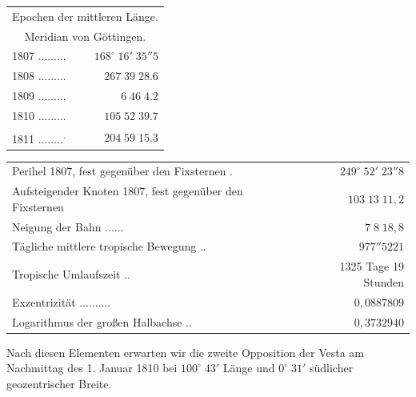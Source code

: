 \begin{center}\fontsize{10}{12}\selectfont\setlength{\tabcolsep}{5pt}\renewcommand{\arraystretch}{1.15}\begin{tabular}{lr}
\multicolumn{2}{c}{Epochen der mittleren Länge.}\\
\multicolumn{2}{c}{Meridian von Göttingen.}\\
1807 .\;.\;.\;.\;.\;.\;.\;.\;.\; & $168^\circ\;16'\;35''5$\\
1808 .\;.\;.\;.\;.\;.\;.\;.\;.\; & $267\;39\;28.6$\\
1809 .\;.\;.\;.\;.\;.\;.\;.\;.\; & $6\;46\;4.2$\\
1810 .\;.\;.\;.\;.\;.\;.\;.\;.\; & $105\;52\;39.7$\\
1811 .\;.\;.\;.\;.\;.\;.\;.\;\textsuperscript{.}\; & $204\;59\;15.3$\\
\end{tabular}\end{center}

\begin{center}\fontsize{9}{11}\selectfont\setlength{\tabcolsep}{5pt}\renewcommand{\arraystretch}{1.15}\begin{tabular}{lr}

Perihel 1807, fest gegenüber den Fixsternen .\; & $249^\circ\;52'\;23''8$\\
Aufsteigender Knoten 1807, fest gegenüber den Fixsternen  & $103\;13\;11{,}2$\\
Neigung der Bahn .\;.\;.\;.\;.\;.\; & $7\;8\;18{,}8$\\
Tägliche mittlere tropische Bewegung .\;.\; & $977''5221$\\
Tropische Umlaufszeit .\;.\; & 1325 Tage 19 Stunden\\
Exzentrizität .\;.\;.\;.\;.\;.\;.\;.\;.\;.\; & $0{,}0887809$\\
Logarithmus der großen Halbachse .\;.\; & $0{,}3732940$\\
\end{tabular}\end{center}


\par\indent Nach diesen Elementen erwarten wir die zweite Opposition der Vesta am Nachmittag des 1. Januar 1810 bei $100^\circ\;43'$ Länge und $0^\circ\;31'$ südlicher geozentrischer Breite.

